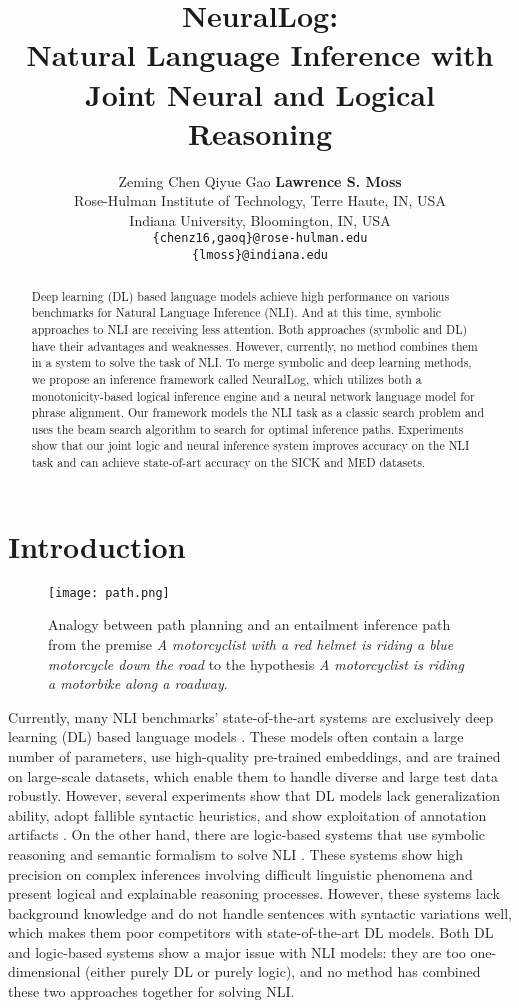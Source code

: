 \documentclass[11pt,a4paper]{article}
\title{NeuralLog: \\Natural Language Inference with Joint Neural and Logical Reasoning}
\author{
{Zeming Chen\footnotemark} \quad
  Qiyue Gao \quad
  \textbf{Lawrence S. Moss} \\
Rose-Hulman Institute of Technology, Terre Haute, IN, USA\\
Indiana University, Bloomington, IN, USA\\
{\tt{\{chenz16,gaoq\}@rose-hulman.edu}} \\
{\tt \{lmoss\}@indiana.edu}
}
\date{}
\begin{document}
\maketitle
{}
\begin{abstract}
Deep learning (DL) based language models achieve high performance on various benchmarks for Natural Language Inference (NLI). And at this time, symbolic approaches to NLI are receiving less attention. Both approaches (symbolic and DL) have their advantages and weaknesses. However, currently, no method combines them in a system to solve the task of NLI. To merge symbolic and deep learning methods, we propose an inference framework called NeuralLog, which utilizes both a monotonicity-based logical inference engine and a neural network language model for phrase alignment. Our framework models the NLI task as a classic search problem and uses the beam search algorithm to search for optimal inference paths. Experiments show that our joint logic and neural inference system improves accuracy on the NLI task and can achieve state-of-art accuracy on the SICK and MED datasets.  \end{abstract}

\section{Introduction}
 \begin{figure}[t!]
    \centering
    \texttt{[image: path.png]}
    \caption{Analogy between path planning and an entailment inference path from the premise \textit{A motorcyclist with a red helmet is riding a blue motorcycle down the road} to the hypothesis \textit{A motorcyclist is riding a motorbike along a roadway}.}
    \label{fig:proof_path}
\end{figure}
Currently, many NLI benchmarks’ state-of-the-art systems are exclusively deep learning (DL) based language models \cite{devlin-etal-2019-bert, Lan2020ALBERT:, liu2020roberta, yin-schutze-2017-task}. These models often contain a large number of parameters, use high-quality pre-trained embeddings, and are trained on large-scale datasets, which enable them to handle diverse and large test data robustly. However,  several experiments show that DL models lack generalization ability, adopt fallible syntactic heuristics, and show exploitation of annotation artifacts \cite{glockner-etal-2018-breaking, mccoy-etal-2019-right, gururangan-etal-2018-annotation}. On the other hand, there are logic-based systems that use symbolic reasoning and semantic formalism to solve NLI \cite{abzianidze-2017-langpro, martinez-gomez-etal-2017-demand, yanaka-etal-2018-acquisition, hu-etal-2020-monalog}. These systems show high precision on complex inferences involving difficult linguistic phenomena and present logical and explainable reasoning processes. However, these systems lack background knowledge and do not handle sentences with syntactic variations well, which makes them poor competitors with state-of-the-art DL models. Both DL and logic-based systems show a major issue with NLI models: they are too one-dimensional (either purely DL or purely logic), and no method has combined these two approaches together for solving NLI. 
\end{document}
